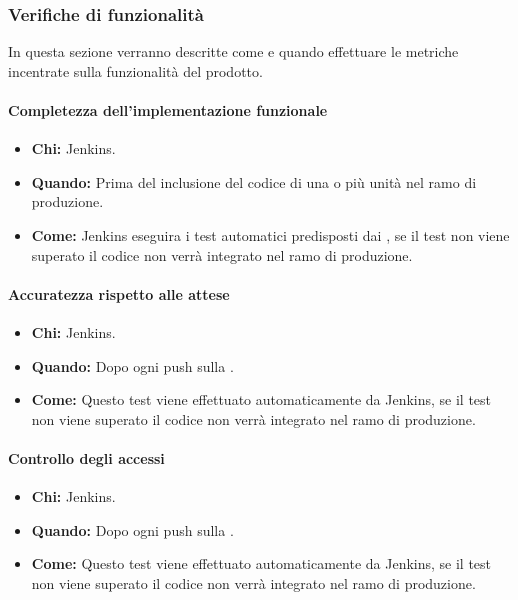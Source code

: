 \newpage
\subsubsection{Verifiche di funzionalità}
In questa sezione verranno descritte come e quando effettuare le metriche incentrate sulla funzionalità del prodotto.

\paragraph{Completezza dell’implementazione funzionale}
\begin{itemize}
\item \textbf{Chi:} Jenkins.
\item \textbf{Quando:} Prima del inclusione del codice di una o più unità nel ramo di produzione.
\item \textbf{Come:} Jenkins eseguira i test automatici predisposti dai \ProgrP, se il test non viene superato il codice non verrà integrato nel ramo di produzione.
\end{itemize}

\paragraph{Accuratezza rispetto alle attese}
\begin{itemize}
\item \textbf{Chi:} Jenkins.
\item \textbf{Quando:} Dopo ogni push sulla .
\item \textbf{Come:} Questo test viene effettuato automaticamente da Jenkins, se il test non viene superato il codice non verrà integrato nel ramo di produzione.
\end{itemize}

\paragraph{Controllo degli accessi}
\begin{itemize}
\item \textbf{Chi:} Jenkins.
\item \textbf{Quando:} Dopo ogni push sulla .
\item \textbf{Come:} Questo test viene effettuato automaticamente da Jenkins, se il test non viene superato il codice non verrà integrato nel ramo di produzione.
\end{itemize}
